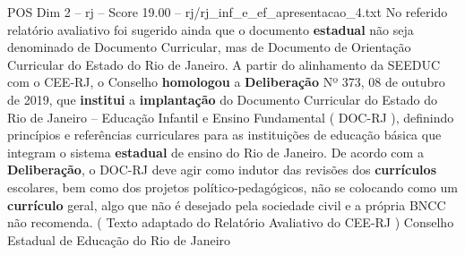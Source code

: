 \begin{textsample}{POS Dim 2 – rj – Score 19.00 – rj/rj\_inf\_e\_ef\_apresentacao\_4.txt}
No referido relatório avaliativo foi sugerido ainda que o documento \textbf{estadual} não seja denominado de Documento Curricular, mas de Documento de Orientação Curricular do Estado do Rio de Janeiro.
A partir do alinhamento da SEEDUC com o CEE-RJ, o Conselho \textbf{homologou} a \textbf{Deliberação} Nº 373, 08 de outubro de 2019, que \textbf{institui} a \textbf{implantação} do Documento Curricular do Estado do Rio de Janeiro – Educação Infantil e Ensino Fundamental ( DOC-RJ ), definindo princípios e referências curriculares para as instituições de educação básica que integram o sistema \textbf{estadual} de ensino do Rio de Janeiro.
De acordo com a \textbf{Deliberação}, o DOC-RJ deve agir como indutor das revisões dos \textbf{currículos} escolares, bem como dos projetos político-pedagógicos, não se colocando como um \textbf{currículo} geral, algo que não é desejado pela sociedade civil e a própria BNCC não recomenda. ( Texto adaptado do Relatório Avaliativo do CEE-RJ ) Conselho Estadual de Educação do Rio de Janeiro

\end{textsample}
